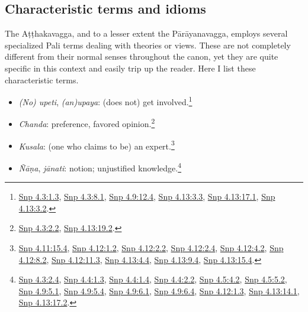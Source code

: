 \documentclass[12pt,openany]{book}%
\begin{document}
\subsection*{Characteristic terms and idioms}

The \textsanskrit{Aṭṭhakavagga}, and to a lesser extent the \textsanskrit{Pārāyanavagga}, employs several specialized Pali terms dealing with theories or views. These are not completely different from their normal senses throughout the canon, yet they are quite specific in this context and easily trip up the reader. Here I list these characteristic terms.

\begin{itemize}%
\item \textit{(No) upeti}, \textit{(an)upaya}: (does not) get involved.\footnote{\href{https://suttacentral.net/snp4.3/en/sujato\#1.3}{Snp 4.3:1.3}, \href{https://suttacentral.net/snp4.3/en/sujato\#8.1}{Snp 4.3:8.1}, \href{https://suttacentral.net/snp4.9/en/sujato\#12.4}{Snp 4.9:12.4}, \href{https://suttacentral.net/snp4.13/en/sujato\#3.3}{Snp 4.13:3.3}, \href{https://suttacentral.net/snp4.13/en/sujato\#17.1}{Snp 4.13:17.1}, \href{https://suttacentral.net/snp4.13/en/sujato\#3.2}{Snp 4.13:3.2}. }%
\item \textit{Chanda}: preference, favored opinion.\footnote{\href{https://suttacentral.net/snp4.3/en/sujato\#2.2}{Snp 4.3:2.2}, \href{https://suttacentral.net/snp4.13/en/sujato\#19.2}{Snp 4.13:19.2}. }%
\item \textit{Kusala}: (one who claims to be) an expert.\footnote{\href{https://suttacentral.net/snp4.11/en/sujato\#15.4}{Snp 4.11:15.4}, \href{https://suttacentral.net/snp4.12/en/sujato\#1.2}{Snp 4.12:1.2}, \href{https://suttacentral.net/snp4.12/en/sujato\#2.2}{Snp 4.12:2.2}, \href{https://suttacentral.net/snp4.12/en/sujato\#2.4}{Snp 4.12:2.4}, \href{https://suttacentral.net/snp4.12/en/sujato\#4.2}{Snp 4.12:4.2}, \href{https://suttacentral.net/snp4.12/en/sujato\#8.2}{Snp 4.12:8.2}, \href{https://suttacentral.net/snp4.12/en/sujato\#11.3}{Snp 4.12:11.3}, \href{https://suttacentral.net/snp4.13/en/sujato\#4.4}{Snp 4.13:4.4}, \href{https://suttacentral.net/snp4.13/en/sujato\#9.4}{Snp 4.13:9.4}, \href{https://suttacentral.net/snp4.13/en/sujato\#15.4}{Snp 4.13:15.4}. }%
\item \textit{\textsanskrit{Ñāṇa}}, \textit{\textsanskrit{jānati}}: notion; unjustified knowledge.\footnote{\href{https://suttacentral.net/snp4.3/en/sujato\#2.4}{Snp 4.3:2.4}, \href{https://suttacentral.net/snp4.4/en/sujato\#1.3}{Snp 4.4:1.3}, \href{https://suttacentral.net/snp4.4/en/sujato\#1.4}{Snp 4.4:1.4}, \href{https://suttacentral.net/snp4.4/en/sujato\#2.2}{Snp 4.4:2.2}, \href{https://suttacentral.net/snp4.5/en/sujato\#4.2}{Snp 4.5:4.2}, \href{https://suttacentral.net/snp4.5/en/sujato\#5.2}{Snp 4.5:5.2}, \href{https://suttacentral.net/snp4.9/en/sujato\#5.1}{Snp 4.9:5.1}, \href{https://suttacentral.net/snp4.9/en/sujato\#5.4}{Snp 4.9:5.4}, \href{https://suttacentral.net/snp4.9/en/sujato\#6.1}{Snp 4.9:6.1}, \href{https://suttacentral.net/snp4.9/en/sujato\#6.4}{Snp 4.9:6.4}, \href{https://suttacentral.net/snp4.12/en/sujato\#1.3}{Snp 4.12:1.3}, \href{https://suttacentral.net/snp4.13/en/sujato\#14.1}{Snp 4.13:14.1}, \href{https://suttacentral.net/snp4.13/en/sujato\#17.2}{Snp 4.13:17.2}. }%

\end{itemize}
\end{document}
